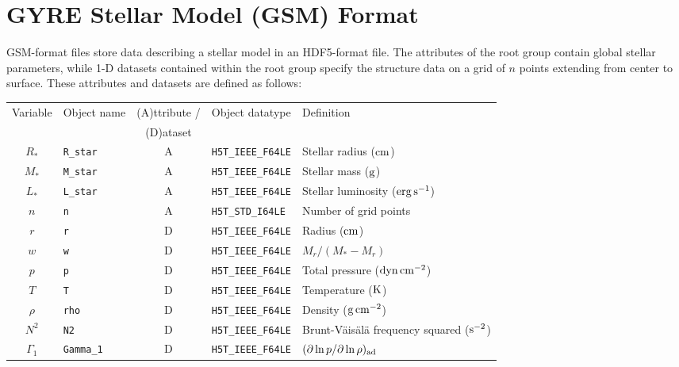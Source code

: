 \documentclass{article}
\newcommand{\Rstar}{\ensuremath{R_{\ast}}}
\newcommand{\Mstar}{\ensuremath{M_{\ast}}}
\newcommand{\Lstar}{\ensuremath{L_{\ast}}}
\newcommand{\cm}{\ensuremath{{\rm cm}}}
\newcommand{\gram}{\ensuremath{{\rm g}}}
\newcommand{\second}{\ensuremath{{\rm s}}}
\newcommand{\dyne}{\ensuremath{{\rm dyn}}}
\newcommand{\erg}{\ensuremath{{\rm erg}}}
\newcommand{\kelvin}{\ensuremath{{\rm K}}}
\begin{document}
\section*{GYRE Stellar Model (GSM) Format}

GSM-format files store data describing a stellar model in an
HDF5-format file. The attributes of the root group contain global
stellar parameters, while 1-D datasets contained within the root group
specify the structure data on a grid of $n$ points extending from
center to surface. These attributes and datasets are defined as
follows:

\begin{table}[h!]
\begin{tabular}{|c|l|c|l|l|} \hline
Variable & Object name & (A)ttribute / & Object datatype & Definition \\
         &             & (D)ataset     &                 &            \\ \hline
\Rstar            & \texttt{R\_star}      & A & \texttt{H5T\_IEEE\_F64LE} & Stellar radius ($\cm$) \\
\Mstar            & \texttt{M\_star}      & A & \texttt{H5T\_IEEE\_F64LE} & Stellar mass ($\gram$) \\
\Lstar            & \texttt{L\_star}      & A & \texttt{H5T\_IEEE\_F64LE} & Stellar luminosity ($\erg\,\second^{-1}$) \\
$n$               & \texttt{n}            & A &\texttt{H5T\_STD\_I64LE}  & Number of grid points \\ 
$r$               & \texttt{r}            & D & \texttt{H5T\_IEEE\_F64LE} & Radius ($\cm$) \\
$w$               & \texttt{w}            & D & \texttt{H5T\_IEEE\_F64LE} & $M_{r}/(\Mstar-M_{r})$ \\
$p$               & \texttt{p}            & D & \texttt{H5T\_IEEE\_F64LE} & Total pressure ($\dyne\,\cm^{-2}$) \\
$T$               & \texttt{T}            & D & \texttt{H5T\_IEEE\_F64LE} & Temperature ($\kelvin$) \\
$\rho$            & \texttt{rho}          & D & \texttt{H5T\_IEEE\_F64LE} & Density ($\gram\,\cm^{-2}$) \\
$N^{2}$           & \texttt{N2}           & D & \texttt{H5T\_IEEE\_F64LE} & Brunt-V\"ais\"al\"a frequency squared ($\second^{-2}$) \\
$\Gamma_{1}$      & \texttt{Gamma\_1}      & D & \texttt{H5T\_IEEE\_F64LE} & $(\partial \ln p/\partial \ln \rho)_{\rm ad}$ \\

\end{tabular}
\end{table}
\end{document}
